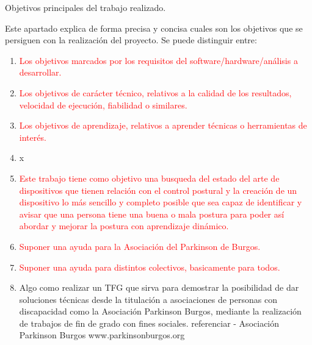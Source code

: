 
Objetivos principales del trabajo realizado.

Este apartado explica de forma precisa y concisa cuales son los objetivos que se persiguen con la realización del proyecto. Se puede distinguir entre:
\begin{enumerate}
    \item \textcolor{red}{Los objetivos marcados por los requisitos del software/hardware/análisis a desarrollar.}
    \item \textcolor{red}{Los objetivos de carácter técnico, relativos a la calidad de los resultados, velocidad de ejecución, fiabilidad o similares.}
    \item \textcolor{red}{Los objetivos de aprendizaje, relativos a aprender técnicas o herramientas de interés. }
    \item x
    \item \textcolor{red}{Este trabajo tiene como objetivo una busqueda del estado del arte de dispositivos que tienen relación con el control postural y la creación de un dispositivo lo más sencillo y completo posible que sea capaz de identificar y avisar que una persona tiene una buena o mala postura para poder así abordar y mejorar la postura con aprendizaje dinámico.}
    \item \textcolor{red}{Suponer una ayuda para la Asociación del Parkinson de Burgos.}
    \item \textcolor{red}{Suponer una ayuda para distintos colectivos, basicamente para todos. } 
    \item Algo como realizar un TFG que sirva para demostrar la posibilidad de dar soluciones técnicas desde la titulación a asociaciones de personas con discapacidad como la Asociación Parkinson Burgos, mediante la realización de trabajos de fin de grado con fines sociales.
 referenciar - Asociación Parkinson Burgos www.parkinsonburgos.org
    
\end{enumerate}








